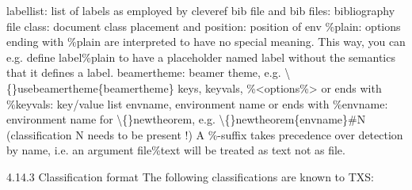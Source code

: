 \documentclass{article}
\begin{document}
	labellist: list of labels as employed by cleveref
	bib file and bib files: bibliography file
	class: document class
	placement and position: position of env
	\%plain: options ending with \%plain are interpreted to have no special meaning. This way, you can e.g. define label\%plain to have a placeholder named label without the semantics that it defines a label.
	beamertheme: beamer theme, e.g. \textbackslash\{\}usebeamertheme\{beamertheme\}
	keys, keyvals, \%<options\%> or ends with \%keyvals: key/value list
	envname, environment name or ends with \%envname: environment name for \textbackslash\{\}newtheorem, e.g. \textbackslash\{\}newtheorem\{envname\}\#N (classification N needs to be present !)
	A \%-suffix takes precedence over detection by name, i.e. an argument file\%text will be treated as text not as file.
	
	4.14.3 Classification format
	The following classifications are known to TXS:
	
\end{document}
